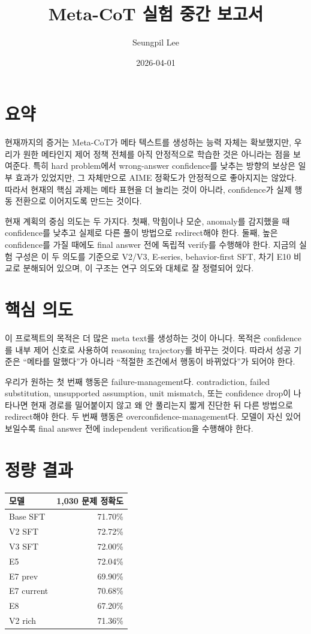\documentclass[11pt]{article}
\title{Meta-CoT 실험 중간 보고서}
\author{Seungpil Lee}
\date{2026-04-01}
\begin{document}
\maketitle
\onehalfspacing

\section*{요약}
현재까지의 증거는 Meta-CoT가 메타 텍스트를 생성하는 능력 자체는 확보했지만, 우리가 원한 메타인지 제어 정책 전체를 아직 안정적으로 학습한 것은 아니라는 점을 보여준다. 특히 hard problem에서 wrong-answer confidence를 낮추는 방향의 보상은 일부 효과가 있었지만, 그 자체만으로 AIME 정확도가 안정적으로 좋아지지는 않았다. 따라서 현재의 핵심 과제는 메타 표현을 더 늘리는 것이 아니라, confidence가 실제 행동 전환으로 이어지도록 만드는 것이다.

현재 계획의 중심 의도는 두 가지다. 첫째, 막힘이나 모순, anomaly를 감지했을 때 confidence를 낮추고 실제로 다른 풀이 방법으로 redirect해야 한다. 둘째, 높은 confidence를 가질 때에도 final answer 전에 독립적 verify를 수행해야 한다. 지금의 실험 구성은 이 두 의도를 기준으로 V2/V3, E-series, behavior-first SFT, 차기 E10 비교로 분해되어 있으며, 이 구조는 연구 의도와 대체로 잘 정렬되어 있다.

\section*{핵심 의도}
이 프로젝트의 목적은 더 많은 meta text를 생성하는 것이 아니다. 목적은 confidence를 내부 제어 신호로 사용하여 reasoning trajectory를 바꾸는 것이다. 따라서 성공 기준은 ``메타를 말했다''가 아니라 ``적절한 조건에서 행동이 바뀌었다''가 되어야 한다.

우리가 원하는 첫 번째 행동은 failure-management다. contradiction, failed substitution, unsupported assumption, unit mismatch, 또는 confidence drop이 나타나면 현재 경로를 밀어붙이지 않고 왜 안 풀리는지 짧게 진단한 뒤 다른 방법으로 redirect해야 한다. 두 번째 행동은 overconfidence-management다. 모델이 자신 있어 보일수록 final answer 전에 independent verification을 수행해야 한다.

\section*{정량 결과}
\begin{center}
\begin{tabular}{lr}
\toprule
모델 & 1,030 문제 정확도 \\
\midrule
Base SFT & 71.70\% \\
V2 SFT & 72.72\% \\
V3 SFT & 72.00\% \\
E5 & 72.04\% \\
E7 prev & 69.90\% \\
E7 current & 70.68\% \\
E8 & 67.20\% \\
V2 rich & 71.36\% \\
\bottomrule
\end{tabular}
\end{center}
\end{document}
